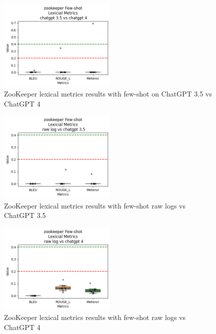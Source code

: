 \documentclass[conference]{IEEEtran}
\begin{document}
\begin{figure}[h!]
    \centering
    \includegraphics[width=0.5\textwidth]{milestone4/img/zookeeper-few-shot-lexical-35-4.png}
    \caption{ZooKeeper lexical metrics results with few-shot on ChatGPT 3.5 vs ChatGPT 4}
    \label{fig:zookeeper-fewshot-lexical-gpt35-gpt4}
\end{figure}

\begin{figure}[h!]
    \centering
    \includegraphics[width=0.5\textwidth]{milestone4/img/zookeeper-few-shot-lexical-raw-35.png}
    \caption{ZooKeeper lexical metrics results with few-shot raw logs vs ChatGPT 3.5}
    \label{fig:zookeeper-fewshot-lexical-raw-gpt35}
\end{figure}

\begin{figure}[h!]
    \centering
    \includegraphics[width=0.5\textwidth]{milestone4/img/zookeeper-few-shot-lexical-raw-4.png}
    \caption{ZooKeeper lexical metrics results with few-shot raw logs vs ChatGPT 4}
    \label{fig:zookeeper-fewshot-lexical-raw-gpt4}
\end{figure}
  
\end{document}
